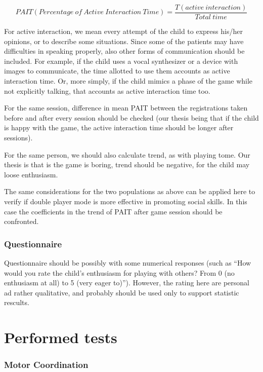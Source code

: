 \documentclass[a4paper,twoside]{book}
\begin{document}
\[PAIT (Percentage\ of\ Active\ Interaction\ Time)=\frac{T(active\ interaction)}{Total\ time}\]

For active interaction, we mean every attempt of the child to express his/her opinions, or to describe some situations. Since some of the patients may have difficulties in speaking properly, also other forms of communication should be included. For example, if the child uses a vocal synthesizer or a device with images to communicate, the time allotted to use them accounts as active interaction time. Or, more simply, if the child mimics a phase of the game while not explicitly talking, that accounts as active interaction time too.

For the same session, difference in mean PAIT between the registrations taken before and after every session should be checked (our thesis being that if the child is happy with the game, the active interaction time should be longer after sessions).

For the same person, we should also calculate trend, as with playing tome. Our thesis is that is the game is boring, trend should be negative, for the child may loose enthusiasm.

The same considerations for the two populations as above can be applied here to verify if double player mode is more effective in promoting social skills. In this case the coefficients in the trend of PAIT after game session should be confronted.

\subsubsection*{Questionnaire}

Questionnaire should be possibly with some numerical responses (such as \textquotedblleft{}How would you rate the child's enthusiasm for playing with others? From 0 (no enthusiasm at all) to 5 (very eager to)\textquotedblright{}). However, the rating here are personal ad rather qualitative, and probably should be used only to support statistic rescults.

\section{Performed tests}

\subsubsection*{Motor Coordination}
\label{ssec:motortest}
\end{document}
